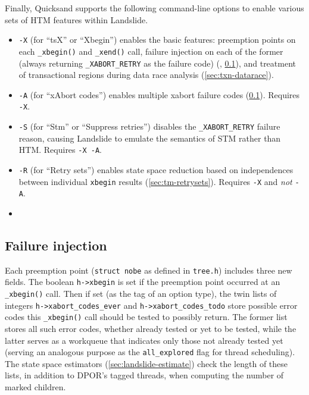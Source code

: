 Finally, Quicksand supports the following command-line options to enable various sets of HTM features within Landslide.
\begin{itemize}
	\item {\tt -X} (for ``tsX'' or ``Xbegin'') enables the basic features:
		preemption points on each {\tt \_xbegin()} and {\tt \_xend()} call,
		failure injection on each of the former
		(always returning {\tt \_XABORT\_RETRY} as the failure code)
		(, \cref{sec:txn-failure}),
		and treatment of transactional regions during data race analysis (\cref{sec:txn-datarace}).
	\item {\tt -A} (for ``xAbort codes'')
		enables multiple xabort failure codes (\cref{sec:txn-failure}).
		Requires {\tt -X}.
	\item {\tt -S} (for ``Stm'' or ``Suppress retries'')
		disables the {\tt \_XABORT\_RETRY} failure reason,
		causing Landslide to emulate the semantics of STM rather than HTM.
		Requires {\tt -X -A}.
	\item {\tt -R} (for ``Retry sets'')
		enables state space reduction based on independences between individual {\tt xbegin} results
		(\cref{sec:tm-retrysets}).
		Requires {\tt -X} and {\em not} {\tt -A}.
	\item {}
\end{itemize}

\subsection{Failure injection}
\label{sec:txn-failure}

Each preemption point ({\tt struct nobe} as defined in {\tt tree.h})
includes three new fields.
The boolean {\tt h->xbegin} is set if the preemption point occurred at an {\tt \_xbegin()} call.
Then if set (as the tag of an option type),
the twin lists of integers
{\tt h->xabort\_codes\_ever}
and
{\tt h->xabort\_codes\_todo}
store possible error codes this {\tt \_xbegin()} call should be tested to possibly return.
The former list stores all such error codes, whether already tested or yet to be tested,
while the latter serves as a workqueue that indicates only those not already tested yet
(serving an analogous purpose as the {\tt all\_explored} flag for thread scheduling).
The state space estimators (\cref{sec:landslide-estimate})
check the length of these lists, in addition to DPOR's tagged threads,
when computing the number of marked children.

